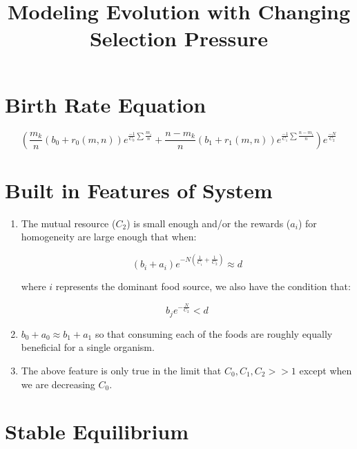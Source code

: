 \documentclass[11pt]{article}
\title{Modeling Evolution with Changing Selection Pressure}
\author{\Name}
\date{}
\begin{document}
\maketitle

\section*{Birth Rate Equation}

	\begin{equation*}
			(\frac{m_k}{n}(b_0 + r_0(m,n))e^{\frac{-1}{C_0}\sum{\frac{m_i}{n}}} + \frac{n - m_k}{n}(b_1 + r_1(m,n))e^{\frac{-1}{C_1}\sum{\frac{n - m_i}{n}}})e^{\frac{-N}{C_2}}
		\end{equation*}
		
\section*{Built in Features of System}

\begin{enumerate}

	\item
	The mutual resource ($C_2$) is small enough and/or the rewards ($a_i$) for homogeneity are large enough that when:
	
	\begin{equation} \label{eq:1}
		(b_i + a_i)e^{-N(\frac{1}{C_i} + \frac{1}{C_2})} \approx d
	\end{equation}
	
	where $i$ represents the dominant food source, we also have the condition that:
	
	\begin{equation*}
		b_je^{-\frac{N}{C_2}} < d
	\end{equation*}
	
	\item
	$b_0 + a_0 \approx b_1 + a_1$ so that consuming each of the foods are roughly equally beneficial for a single organism.
	
	\item
	The above feature is only true in the limit that $C_0,C_1,C_2 >> 1$ except when we are decreasing $C_0$.
	
\end{enumerate}
	
	

\section*{Stable Equilibrium}
\end{document}
